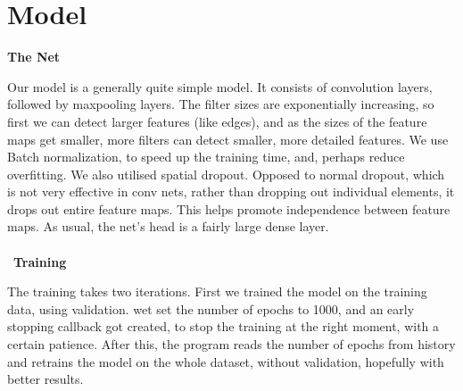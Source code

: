 \section{Model}

\textbf{The Net}

Our model is a generally quite simple model. It consists of convolution layers, followed by maxpooling layers. The filter sizes are exponentially increasing, so first we can detect larger features (like edges), and as the sizes of the feature maps get smaller, more filters can detect smaller, more detailed features. We use Batch normalization, to speed up the training time, and, perhaps reduce overfitting. We also utilised spatial dropout. Opposed to normal dropout, which is not very effective in conv nets, rather than dropping out individual elements, it drops out entire feature maps. This helps promote independence between feature maps. As usual, the net’s head is a fairly large dense layer.
\\\
\\\
\textbf{Training}

The training takes two iterations. First we trained the model on the training data, using validation. wet set the number of epochs to 1000, and an early stopping callback got created, to stop the training at the right moment, with a certain patience. After this, the program reads the number of epochs from history and retrains the model on the whole dataset, without validation, hopefully with better results.